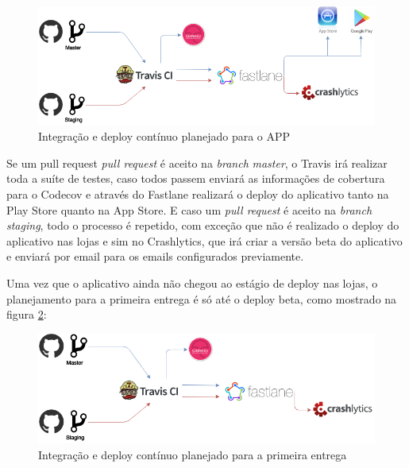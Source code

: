 \begin{figure}[H]
    \centering
    \includegraphics[scale=0.5]{figuras/ci_should_be.png}
    \caption[Integração e deploy contínuo planejado para o APP]{Integração e deploy contínuo planejado para o APP}
    \label{img:integracao_deploy_continuo_planejado_app}
\end{figure}

Se um pull request \textit{pull request} é aceito na \textit{branch} \textit{master}, o Travis irá realizar toda a suíte de testes, caso todos passem enviará as informações de cobertura para o
Codecov e através do Fastlane realizará o deploy do aplicativo tanto na Play Store quanto na App Store. E caso um \textit{pull request} é aceito na \textit{branch} \textit{staging}, todo o processo é repetido, com exceção
que não é realizado o deploy do aplicativo nas lojas e sim no Crashlytics, que irá criar a versão beta do aplicativo e enviará por email para os emails configurados previamente.

Uma vez que o aplicativo ainda não chegou ao estágio de deploy nas lojas, o planejamento para a primeira entrega é só até o deploy beta, como mostrado na figura \ref{img:integracao_deploy_continuo_planejado_primeira_entrega}:

\begin{figure}[H]
    \centering
    \includegraphics[scale=0.5]{figuras/ci_as_is.png}
    \caption[Integração e deploy contínuo planejado para o APP]{Integração e deploy contínuo planejado para a primeira entrega}
    \label{img:integracao_deploy_continuo_planejado_primeira_entrega}
\end{figure}

